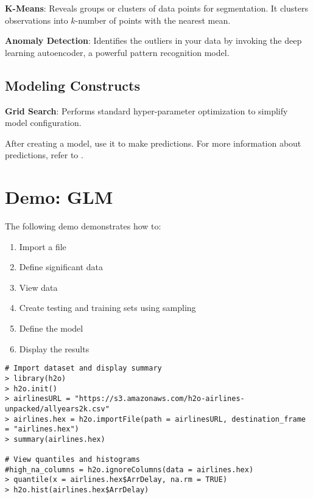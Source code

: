{{{\textbf{K-Means}}: Reveals groups or clusters of data points for segmentation. It clusters observations into $k$-number of points with the nearest mean.

{\textbf{Anomaly Detection}}: Identifies the outliers in your data by invoking the deep learning autoencoder, a powerful pattern recognition model.

\subsection{Modeling Constructs}

{\textbf{Grid Search}}: Performs standard hyper-parameter optimization to simplify model configuration. %

After creating a model, use it to make predictions. For more information about predictions, refer to .


\section{Demo: GLM}

The following demo demonstrates how to:

\begin{enumerate}
\item  Import a file
\item Define significant data
\item View data
\item Create testing and training sets using sampling
\item Define the model
\item Display the results
\end{enumerate}

\begin{lstlisting}[style=R]
# Import dataset and display summary
> library(h2o)
> h2o.init()
> airlinesURL = "https://s3.amazonaws.com/h2o-airlines-unpacked/allyears2k.csv"
> airlines.hex = h2o.importFile(path = airlinesURL, destination_frame = "airlines.hex")
> summary(airlines.hex)

# View quantiles and histograms
#high_na_columns = h2o.ignoreColumns(data = airlines.hex)
> quantile(x = airlines.hex$ArrDelay, na.rm = TRUE)
> h2o.hist(airlines.hex$ArrDelay)


\end{lstlisting}}}

